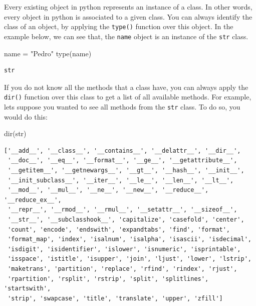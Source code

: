 \documentclass[
  11pt,
  letterpaper,
  DIV=11,
  numbers=noendperiod]{scrreprt}
\newenvironment{Shaded}{\begin{snugshade}}{\end{snugshade}}
\newcommand{\BuiltInTok}[1]{\textcolor[rgb]{0.00,0.23,0.31}{#1}}
\newcommand{\NormalTok}[1]{\textcolor[rgb]{0.00,0.23,0.31}{#1}}
\newcommand{\OperatorTok}[1]{\textcolor[rgb]{0.37,0.37,0.37}{#1}}
\newcommand{\StringTok}[1]{\textcolor[rgb]{0.13,0.47,0.30}{#1}}
\begin{document}
Every existing object in python represents an instance of a class. In
other words, every object in python is associated to a given class. You
can always identify the class of an object, by applying the
\texttt{type()} function over this object. In the example below, we can
see that, the \texttt{name} object is an instance of the \texttt{str}
class.

\begin{Shaded}
\begin{Highlighting}[]
\NormalTok{name }\OperatorTok{=} \StringTok{"Pedro"}
\BuiltInTok{type}\NormalTok{(name)}
\end{Highlighting}
\end{Shaded}

\begin{verbatim}
str
\end{verbatim}

If you do not know all the methods that a class have, you can always
apply the \texttt{dir()} function over this class to get a list of all
available methods. For example, lets suppose you wanted to see all
methods from the \texttt{str} class. To do so, you would do this:

\begin{Shaded}
\begin{Highlighting}[]
\BuiltInTok{dir}\NormalTok{(}\BuiltInTok{str}\NormalTok{)}
\end{Highlighting}
\end{Shaded}

\begin{verbatim}
['__add__', '__class__', '__contains__', '__delattr__', '__dir__',
 '__doc__', '__eq__', '__format__', '__ge__', '__getattribute__',
 '__getitem__', '__getnewargs__', '__gt__', '__hash__', '__init__',
 '__init_subclass__', '__iter__', '__le__', '__len__', '__lt__', 
 '__mod__', '__mul__', '__ne__', '__new__', '__reduce__', '__reduce_ex__',
 '__repr__', '__rmod__', '__rmul__', '__setattr__', '__sizeof__', 
 '__str__', '__subclasshook__', 'capitalize', 'casefold', 'center',
 'count', 'encode', 'endswith', 'expandtabs', 'find', 'format',
 'format_map', 'index', 'isalnum', 'isalpha', 'isascii', 'isdecimal',
 'isdigit', 'isidentifier', 'islower', 'isnumeric', 'isprintable',
 'isspace', 'istitle', 'isupper', 'join', 'ljust', 'lower', 'lstrip', 
 'maketrans', 'partition', 'replace', 'rfind', 'rindex', 'rjust', 
 'rpartition', 'rsplit', 'rstrip', 'split', 'splitlines', 'startswith',
 'strip', 'swapcase', 'title', 'translate', 'upper', 'zfill']
\end{verbatim}
\end{document}
